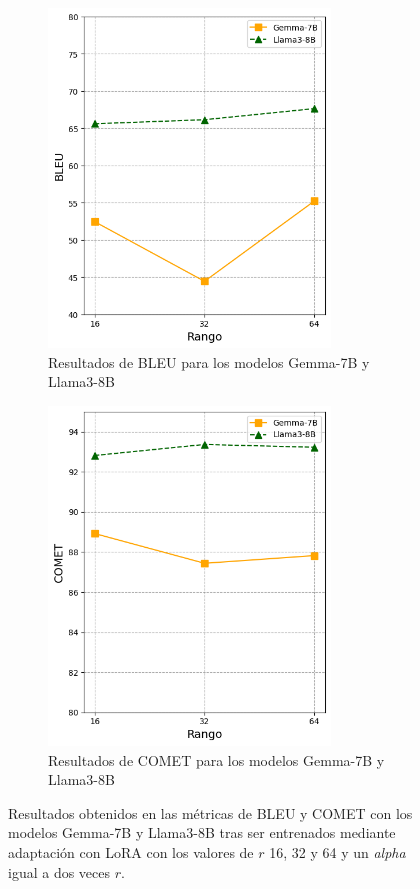 \documentclass[11pt,spanish,listoffigures,listoftables]{tfgetsinf}
\begin{document}
\begin{figure}[h]

\begin{subfigure}{0.5\textwidth}
\includegraphics[width=0.9\linewidth, height=9cm]{images/gemma_llama_BLEU} 
\caption{Resultados de BLEU para los modelos Gemma-7B y Llama3-8B}
\label{fig:subim1}
\end{subfigure}
\begin{subfigure}{0.5\textwidth}
\includegraphics[width=0.9\linewidth, height=9cm]{images/gemma_llama_COMET}
\caption{Resultados de COMET para los modelos Gemma-7B y Llama3-8B}
\label{fig:subim2}
\end{subfigure}

\caption{Resultados obtenidos en las métricas de BLEU y COMET con los modelos Gemma-7B y Llama3-8B tras ser entrenados mediante adaptación con LoRA con los valores de $r$ 16, 32 y 64 y un \textit{alpha} igual a dos veces $r$.}
\label{fig:image2}
\end{figure}
\end{document}
